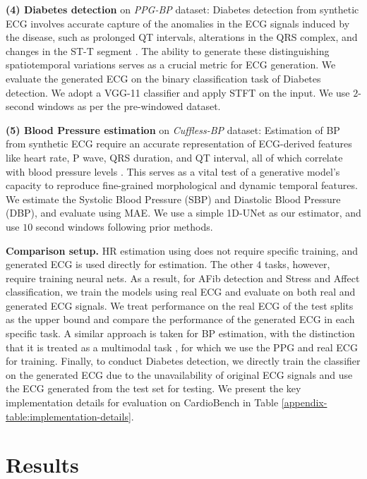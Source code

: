 \documentclass[letterpaper]{article} %
\begin{document}
    \textbf{(4) Diabetes detection} on \textit{PPG-BP} \cite{liang2018new} dataset: Diabetes detection from synthetic ECG involves accurate capture of the
    anomalies in the ECG signals induced by the disease, such as prolonged QT intervals, alterations in the QRS complex, and changes in the ST-T segment \cite{veglio2004qt}. The ability to generate these distinguishing spatiotemporal variations serves as a crucial metric for ECG generation. We evaluate the generated ECG on the binary classification task of Diabetes detection.
    We adopt a VGG-11 classifier \cite{reiss2019deep} and apply STFT on the input. We use $2$-second windows as per the pre-windowed dataset.

    \textbf{(5) Blood Pressure estimation} on \textit{Cuffless-BP} \cite{kachuee2015cuff} dataset: Estimation of BP from synthetic ECG require an accurate representation of ECG-derived features like heart rate, P wave, QRS duration, and QT interval, all of which correlate with blood pressure levels \cite{peng2006heart, bird2020assessment}.
    This serves as a vital test of a generative model's capacity to reproduce fine-grained morphological and dynamic temporal features.
    We estimate the Systolic Blood Pressure (SBP) and Diastolic Blood Pressure (DBP), and evaluate using MAE.
    We use a simple 1D-UNet \cite{long2023bpnet} as our estimator, and use $10$ second windows following prior methods.


\noindent \textbf{Comparison setup.}
HR estimation using \cite{hamilton2002open}
does not require specific training, and generated ECG is used directly for estimation. The other $4$ tasks, however, require training neural nets. As a result, for AFib detection and Stress and Affect classification, we train the models using real ECG and evaluate on both real and generated ECG signals. We treat performance on the real ECG of the test splits as the upper bound and compare the performance of the generated ECG in each specific task. A similar approach is taken for BP estimation, with the distinction that it is treated as a multimodal task \cite{elgendi2019use}, for which we use the PPG and real ECG for training. Finally, to conduct Diabetes detection, we directly train the classifier on the generated ECG due to the unavailability of original ECG signals and use the ECG generated from the test set for testing. We present the key implementation details for evaluation on CardioBench in Table \ref{appendix-table:implementation-details}.

\section{Results}
\end{document}
